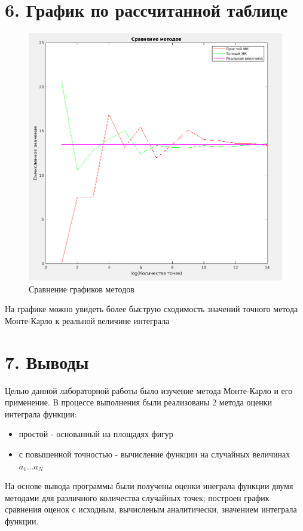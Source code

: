 \documentclass[12pt]{article}
\begin{document}
\newpage
 \section*{6. График по рассчитанной таблице}
 
\begin{figure}[!h]
	\centering
	\includegraphics[width=\linewidth]{MK_compare_graph.png}
	\caption{Сравнение графиков методов}
\end{figure}

На графике можно увидеть более быструю сходимость значений точного метода Монте-Карло к реальной величине интеграла


\newpage
 \section*{7. Выводы}
Целью данной лабораторной работы было изучение метода Монте-Карло и его применение. В процессе выполнения были реализованы 2 метода оценки интеграла функции: 

\begin{itemize}
	\item простой - основанный на площадях фигур
	\item с повышенной точностью - вычисление функции на случайных величинах $a_1\dots a_N$
\end{itemize}

На основе вывода программы были получены оценки инеграла функции двумя методами для различного количества случайных точек; построен график сравнения оценок с исходным, вычисленым аналитически, значением интеграла функции.
\end{document}
